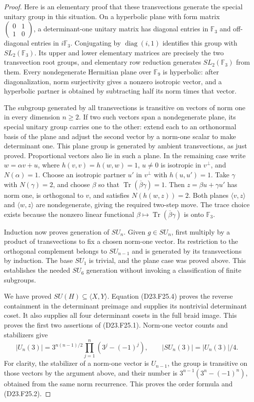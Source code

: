 \begin{proof}
Here is an elementary proof that these transvections generate the
special unitary group in this situation.  On a hyperbolic plane
with form matrix $\left(\begin{smallmatrix}0&1\\1&0\end{smallmatrix}\right)$,
a determinant-one unitary matrix has diagonal entries in
$\mathbb F_3$ and off-diagonal entries in $i\mathbb F_3$.
Conjugating by $\operatorname{diag}(i,1)$ identifies this group
with $SL_2(\mathbb F_3)$.  Its upper and lower elementary matrices
are precisely the two transvection root groups, and elementary
row reduction generates $SL_2(\mathbb F_3)$ from them.
Every nondegenerate Hermitian plane over $\mathbb F_9$ is
hyperbolic: after diagonalization, norm surjectivity gives a
nonzero isotropic vector, and a hyperbolic partner is obtained
by subtracting half its norm times that vector.

The subgroup generated by all transvections is transitive on
vectors of norm one in every dimension $n\ge2$.  If two such
vectors span a nondegenerate plane, its special unitary group
carries one to the other: extend each to an orthonormal basis
of the plane and adjust the second vector by a norm-one scalar
to make determinant one.  This plane group is generated by
ambient transvections, as just proved.  Proportional vectors
also lie in such a plane.  In the remaining case write
$w=\alpha v+u$, where $h(v,v)=h(w,w)=1$, $u\ne0$ is isotropic
in $v^\perp$, and $N(\alpha)=1$.  Choose an isotropic partner
$u'$ in $v^\perp$ with $h(u,u')=1$.  Take $\gamma$ with
$N(\gamma)=2$, and choose $\beta$ so that
$\operatorname{Tr}(\overline\beta\gamma)=1$.
Then $z=\beta u+\gamma u'$ has norm one, is orthogonal to $v$,
and satisfies $N(h(w,z))=2$.  Both planes $\langle v,z\rangle$
and $\langle w,z\rangle$ are nondegenerate, giving the required
two-step move.  The trace choice exists because the nonzero
linear functional $\beta\mapsto\operatorname{Tr}
(\overline\beta\gamma)$ is onto $\mathbb F_3$.

Induction now proves generation of $SU_n$.  Given $g\in SU_n$,
first multiply by a product of transvections to fix a chosen
norm-one vector.  Its restriction to the orthogonal complement
belongs to $SU_{n-1}$ and is generated by its transvections by
induction.  The base $SU_1$ is trivial, and the plane case was
proved above.  This establishes the needed $SU_6$ generation
without invoking a classification of finite subgroups.

We have proved $SU(H)\subseteq\langle X,Y\rangle$.
Equation (D23.F25.4) proves the reverse containment in the
determinant preimage and supplies its nontrivial determinant
coset.  It also supplies all four determinant cosets in the
full braid image.  This proves the first two assertions of
(D23.F25.1).  Norm-one vector counts and stabilizers give
\[
 |U_n(3)|=3^{n(n-1)/2}\prod_{j=1}^{n}(3^j-(-1)^j),
 \qquad |SU_n(3)|=|U_n(3)|/4.
\]
For clarity, the stabilizer of a norm-one vector is $U_{n-1}$,
the group is transitive on those vectors by the argument above,
and their number is $3^{n-1}(3^n-(-1)^n)$, obtained from the
same norm recurrence.  This proves the order formula and
(D23.F25.2).


\end{proof}
